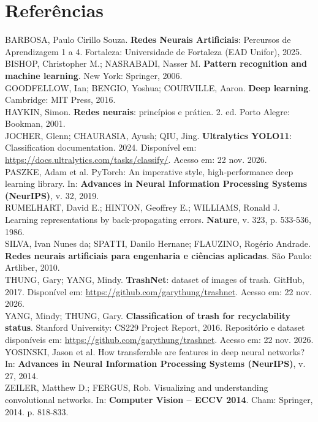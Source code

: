 \documentclass[11pt,a4paper]{article}
\begin{document}
\section*{Referências}
\begin{flushleft}
\footnotesize
BARBOSA, Paulo Cirillo Souza. \textbf{Redes Neurais Artificiais}: Percursos de Aprendizagem 1 a 4. Fortaleza: Universidade de Fortaleza (EAD Unifor), 2025.\\[4pt]
BISHOP, Christopher M.; NASRABADI, Nasser M. \textbf{Pattern recognition and machine learning}. New York: Springer, 2006.\\[4pt]
GOODFELLOW, Ian; BENGIO, Yoshua; COURVILLE, Aaron. \textbf{Deep learning}. Cambridge: MIT Press, 2016.\\[4pt]
HAYKIN, Simon. \textbf{Redes neurais}: princípios e prática. 2. ed. Porto Alegre: Bookman, 2001.\\[4pt]
JOCHER, Glenn; CHAURASIA, Ayush; QIU, Jing. \textbf{Ultralytics YOLO11}: Classification documentation. 2024. Disponível em: \url{https://docs.ultralytics.com/tasks/classify/}. Acesso em: 22 nov. 2026.\\[4pt]
PASZKE, Adam et al. PyTorch: An imperative style, high-performance deep learning library. In: \textbf{Advances in Neural Information Processing Systems (NeurIPS)}, v. 32, 2019.\\[4pt]
RUMELHART, David E.; HINTON, Geoffrey E.; WILLIAMS, Ronald J. Learning representations by back-propagating errors. \textbf{Nature}, v. 323, p. 533-536, 1986.\\[4pt]
SILVA, Ivan Nunes da; SPATTI, Danilo Hernane; FLAUZINO, Rogério Andrade. \textbf{Redes neurais artificiais para engenharia e ciências aplicadas}. São Paulo: Artliber, 2010.\\[4pt]
THUNG, Gary; YANG, Mindy. \textbf{TrashNet}: dataset of images of trash. GitHub, 2017. Disponível em: \url{https://github.com/garythung/trashnet}. Acesso em: 22 nov. 2026.\\[4pt]
YANG, Mindy; THUNG, Gary. \textbf{Classification of trash for recyclability status}. Stanford University: CS229 Project Report, 2016. Repositório e dataset disponíveis em: \url{https://github.com/garythung/trashnet}. Acesso em: 22 nov. 2026.\\[4pt]
YOSINSKI, Jason et al. How transferable are features in deep neural networks? In: \textbf{Advances in Neural Information Processing Systems (NeurIPS)}, v. 27, 2014.\\[4pt]
ZEILER, Matthew D.; FERGUS, Rob. Visualizing and understanding convolutional networks. In: \textbf{Computer Vision -- ECCV 2014}. Cham: Springer, 2014. p. 818-833.
\end{flushleft}
\end{document}
